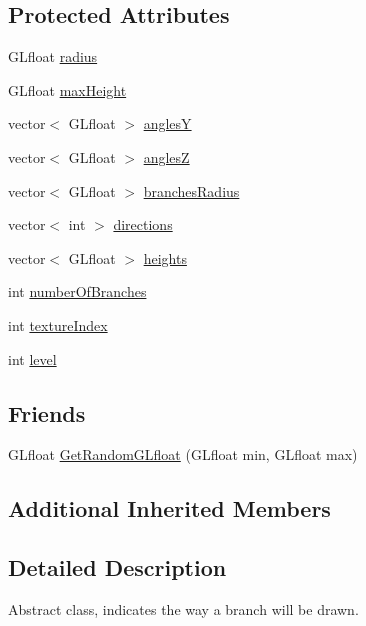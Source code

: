\subsection*{Protected Attributes}
\begin{DoxyCompactItemize}
\item 
G\+Lfloat \hyperlink{class_plant_abef0f751fe6b1b43ed208966a70b4ab3}{radius}
\item 
G\+Lfloat \hyperlink{class_plant_a71a5a857d8a0adcfb612dadfcfffc731}{max\+Height}
\item 
vector$<$ G\+Lfloat $>$ \hyperlink{class_plant_a16888c602067089a5aaa25ab6a92466f}{angles\+Y}
\item 
vector$<$ G\+Lfloat $>$ \hyperlink{class_plant_a298b462dbd0b350d08b5262990a2576b}{angles\+Z}
\item 
vector$<$ G\+Lfloat $>$ \hyperlink{class_plant_a4d8a4ea7bbede32b0f6ba1f3415d8f54}{branches\+Radius}
\item 
vector$<$ int $>$ \hyperlink{class_plant_a3ec2334fa4c49998f74f62240eaf7537}{directions}
\item 
vector$<$ G\+Lfloat $>$ \hyperlink{class_plant_aa12026d894eba8a2764d5edf94757850}{heights}
\item 
int \hyperlink{class_plant_a4f86c46865d6211636140cef8805c6ee}{number\+Of\+Branches}
\item 
int \hyperlink{class_plant_aeaaf035b21354b12a272f66db178f5cb}{texture\+Index}
\item 
int \hyperlink{class_plant_ab49e92a2ab4ecdc762b5a1711fa3d65f}{level}
\end{DoxyCompactItemize}
\subsection*{Friends}
\begin{DoxyCompactItemize}
\item 
G\+Lfloat \hyperlink{class_plant_a38de3a3700e430ebecffa518977d2880}{Get\+Random\+G\+Lfloat} (G\+Lfloat min, G\+Lfloat max)
\end{DoxyCompactItemize}
\subsection*{Additional Inherited Members}


\subsection{Detailed Description}
Abstract class, indicates the way a branch will be drawn. 

